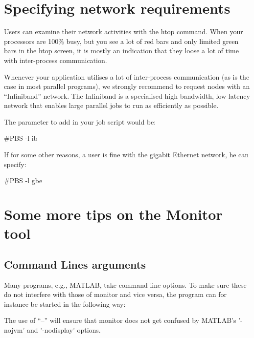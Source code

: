 \section{Specifying network requirements}

Users can examine their network activities with the htop command. When your
processors are 100\% busy, but you see a lot of red bars and only limited green
bars in the htop screen, it is mostly an indication that they loose a lot of
time with inter-process communication.

Whenever your application utilises a lot of inter-process communication (as is
the case in most parallel programs), we strongly recommend to request nodes
with an ``Infiniband'' network. The Infiniband is a specialised high bandwidth,
low latency network that enables large parallel jobs to run as efficiently as
possible.

The parameter to add in your job script would be:

\begin{prompt}
#PBS -l ib
\end{prompt}

If for some other reasons, a user is fine with the gigabit Ethernet network, he
can specify:

\begin{prompt}
#PBS -l gbe
\end{prompt}

\ifgent
\else
  \section{Some more tips on the Monitor tool}

  \subsection{Command Lines arguments}

  Many programs, e.g., MATLAB, take command line options. To make sure these do
  not interfere with those of monitor and vice versa, the program can for
  instance be started in the following way:

\begin{prompt}
\end{prompt}

  The use of ``--'' will ensure that monitor does not get confused by MATLAB's '-nojvm' and '-nodisplay' options.


